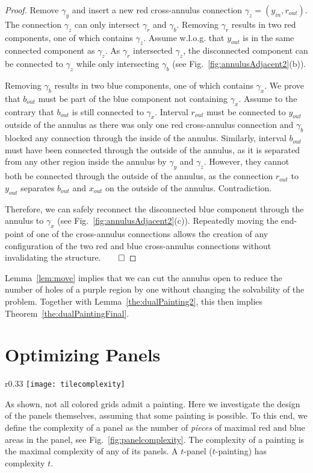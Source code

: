 \documentclass[runningheads]{llncs}
\begin{document}
\begin{proof}
Remove $\gamma_y$ and insert a new red cross-annulus connection $\gamma_z = (y_{in},r_{out})$.
The connection $\gamma_z$ can only intersect $\gamma_r$ and $\gamma_b$.
Removing $\gamma_r$ results in two red components, one of which contains $\gamma_z$.
Assume w.l.o.g. that $y_{out}$ is in the same connected component as $\gamma_z$. As $\gamma_r$ intersected $\gamma_z$, the disconnected component can be connected to $\gamma_z$ while only intersecting $\gamma_b$ (see Fig.~\ref{fig:annulusAdjacent2}(b)).

Removing $\gamma_b$ results in two blue components, one of which contains $\gamma_x$.
We prove that $b_{out}$ must be part of the blue component not containing $\gamma_x$.
Assume to the contrary that $b_{out}$ is still connected to $\gamma_x$.
Interval $r_{out}$ must be connected to $y_{out}$ outside of the annulus as there was only one red cross-annulus connection and $\gamma_b$ blocked any connection through the inside of the annulus.
Similarly, interval $b_{out}$ must have been connected through the outside of the annulus, as it is separated from any other region inside the annulus by $\gamma_y$ and $\gamma_z$.
However, they cannot both be connected through the outside of the annulus, as the connection $r_{out}$ to $y_{out}$ separates $b_{out}$ and $x_{out}$ on the outside of the annulus.
Contradiction.

Therefore, we can safely reconnect the disconnected blue component through the annulus to $\gamma_x$ (see Fig.~\ref{fig:annulusAdjacent2}(c)).
Repeatedly moving the end-point of one of the cross-annulus connections allows the creation of any configuration of the two red and blue cross-annulus connections without invalidating the structure.\hfill $\qed$
\end{proof}

Lemma~\ref{lem:move} implies that we can cut the annulus open to reduce the number of holes of a purple region by one without changing the solvability of the problem.
Together with Lemma~\ref{the:dualPainting2}, this then implies Theorem~\ref{the:dualPaintingFinal}.

\section{Optimizing Panels}
\label{sec:painting}

\begin{wrapfigure}[8]{r}{0.33\linewidth}
  \centering
  \vspace{-2\baselineskip}
  \texttt{[image: tilecomplexity]}
  \caption{Panels with complexity $3$ and $5$ respectively.}
  \label{fig:panelcomplexity}
\end{wrapfigure}
As shown, not all colored grids admit a painting.
Here we investigate the design of the panels themselves, assuming
that some painting is possible. 
To this end, we define the complexity of a panel as
the number of \emph{pieces} of maximal red and blue areas in the panel, see Fig.~\ref{fig:panelcomplexity}.
The complexity of a painting is the maximal complexity of any of its panels.
A $t$-panel ($t$-painting) has complexity $t$.
\end{document}
